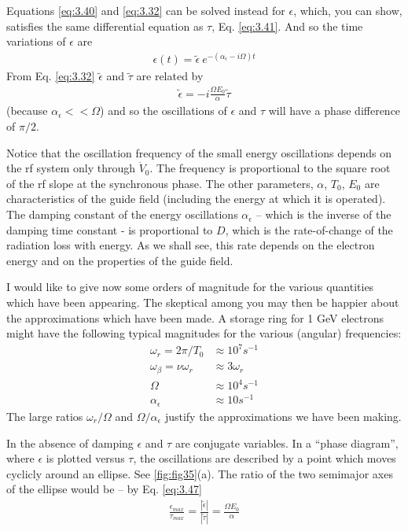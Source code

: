 \documentclass[../sands-adaptation.tex]{subfiles}
\begin{document}
Equations \eqref{eq:3.40} and \eqref{eq:3.32} can be solved instead for $\epsilon$, which, you can show, satisfies the same differential equation as $\tau$, Eq. \eqref{eq:3.41}. And so the time variations of $\epsilon$ are
\begin{align}
	\epsilon(t) = \tilde{\epsilon}\ e^{-(\alpha_\epsilon - i\Omega)t}
\end{align}
From Eq. \eqref{eq:3.32} $\tilde{\epsilon}$ and $\tilde{\tau}$ are related by
\begin{align}
	\tilde{\epsilon} = -i\frac{\Omega E_0}{\alpha}\tilde{\tau}\label{eq:3.47}
\end{align}
(because $\alpha_\epsilon << \Omega$) and so the oscillations of $\epsilon$ and $\tau$ will have a phase difference of $\pi/2$.

Notice that the oscillation frequency of the small energy oscillations depends on the rf system only through $\dot{V}_0$. The frequency is proportional to the square root of the rf slope at the synchronous phase. The other parameters, $\alpha$, $T_0$, $E_0$ are characteristics of the guide field (including the energy at which it is operated). The damping constant of the energy oscillations $\alpha_\epsilon$ -- which is the inverse of the damping time constant - is proportional to $D$, which is the rate-of-change of the radiation loss with energy. As we shall see, this rate depends on the electron energy and on the properties of the guide field.

I would like to give now some orders of magnitude for the various quantities which have been appearing. The skeptical among you may then be happier about the approximations which have been made. A storage ring for 1 GeV electrons might have the following typical magnitudes for the various (angular) frequencies:
\begin{align*}
	\omega_r = 2\pi /T_0 &\approx 10^7 s^{-1}\\
	\omega_\beta = \nu \omega_r &\approx 3\omega_r\\
	\Omega &\approx 10^4 s^{-1}\\
	\alpha_\epsilon &\approx 10 s^{-1}
\end{align*}
The large ratios $\omega_r/\Omega$ and $\Omega/\alpha_\epsilon$ justify the approximations we have been making.

In the absence of damping $\epsilon$ and $\tau$ are conjugate variables. In a ``phase diagram'', where $\epsilon$ is plotted versus $\tau$, the oscillations are described by a point which moves cyclicly around an ellipse. See \autoref{fig:fig35}(a). The ratio of the two semimajor axes of the ellipse would be -- by Eq. \eqref{eq:3.47}
\begin{align}
	\frac{\epsilon_{max}}{\tau_{max}} = \frac{|\tilde{\epsilon}|}{|\tilde{\tau}|} = \frac{\Omega E_0}{\alpha}
\end{align}
\end{document}
